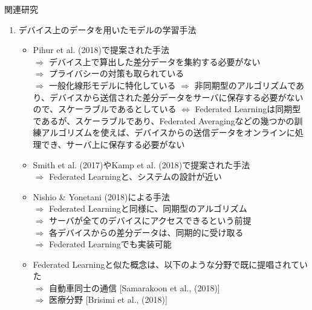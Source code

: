 \documentclass[dvipdfmx,notheorems,t]{beamer}
\begin{document}
\begin{frame}{関連研究}

\begin{enumerate}
	\item デバイス上のデータを用いたモデルの学習手法
	\begin{itemize}
		\item Pihur et al. (2018)で提案された手法 \\
		$\Rightarrow$ デバイス上で算出した差分データを集約する必要がない \\
		$\Rightarrow$ プライバシーの対策も取られている \\
		$\Rightarrow$ 一般化線形モデルに特化している \newline \newline
		$\Rightarrow$ 非同期型のアルゴリズムであり、デバイスから送信された差分データをサーバに保存する必要がないので、スケーラブルであるとしている \newline \newline
		$\Leftrightarrow$ Federated Learningは同期型であるが、スケーラブルであり、Federated Averagingなどの幾つかの訓練アルゴリズムを使えば、デバイスからの送信データをオンラインに処理でき、サーバ上に保存する必要がない
		\newline
		
		\item Smith et al. (2017)やKamp et al. (2018)で提案された手法 \\
		$\Rightarrow$ Federated Learningと、システムの設計が近い
		
		\framebreak
		
		\item Nishio \& Yonetani (2018)による手法 \\
		$\Rightarrow$ Federated Learningと同様に、同期型のアルゴリズム \\
		$\Rightarrow$ サーバが全てのデバイスにアクセスできるという前提 \\
		$\Rightarrow$ 各デバイスからの差分データは、同期的に受け取る \\
		$\Rightarrow$ Federated Learningでも実装可能
		\newline
		
		\item Federated Learningと似た概念は、以下のような分野で既に提唱されていた \\
		$\Rightarrow$ 自動車同士の通信 [Samarakoon et al., (2018)] \\
		$\Rightarrow$ 医療分野 [Brisimi et al., (2018)]
	\end{itemize}
	

\end{enumerate}
\end{frame}
\end{document}
